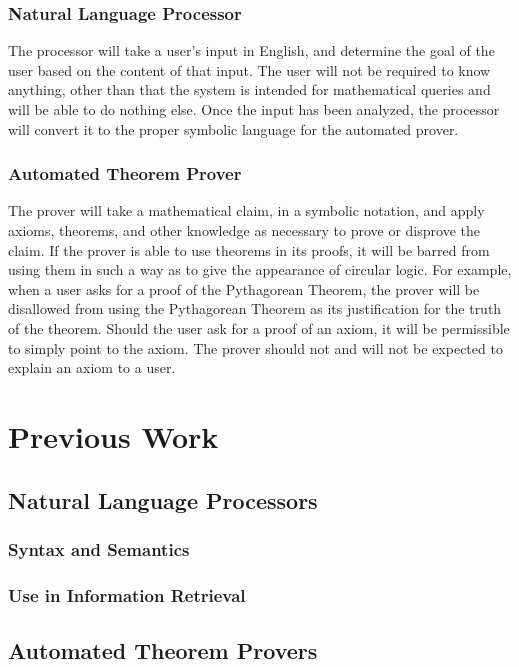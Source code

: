 \documentclass[12pt]{article}
\begin{document}
\subsubsection{Natural Language Processor}
The processor will take a user's input in English, and determine the goal of the user based on the content of that input. The user will not be required to know anything, other than that the system is intended for mathematical queries and will be able to do nothing else. Once the input has been analyzed, the processor will convert it to the proper symbolic language for the automated prover.
\subsubsection{Automated Theorem Prover}

The prover will take a mathematical claim, in a symbolic notation, and apply axioms, theorems, and other knowledge as necessary to prove or disprove the claim. If the prover is able to use theorems in its proofs, it will be barred from using them in such a way as to give the appearance of circular logic. For example, when a user asks for a proof of the Pythagorean Theorem, the prover will be disallowed from using the Pythagorean Theorem as its justification for the truth of the theorem. %
Should the user ask for a proof of an axiom, it will be permissible to simply point to the axiom. The prover should not and will not be expected to explain an axiom to a user.


\section{Previous Work}
\subsection{Natural Language Processors}


\subsubsection{Syntax and Semantics}
\subsubsection{Use in Information Retrieval}
\subsection{Automated Theorem Provers}
\end{document}
